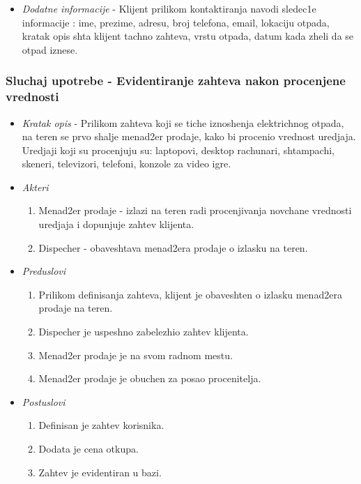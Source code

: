 \documentclass[10 pt]{article}
\begin{document}
\begin{itemize}
\begin{enumerate}
					
				\end{enumerate}

			
			\item\textit{Dodatne informacije}
-	Klijent prilikom kontaktiranja navodi sledec1e informacije :
ime, prezime, adresu, broj telefona, email, lokaciju otpada, kratak opis shta klijent tachno zahteva, vrstu otpada, datum kada zheli da se otpad iznese.

			
		\end{itemize}
	
	\subsubsection{Sluchaj upotrebe - Evidentiranje zahteva nakon procenjene vrednosti}
	
		\begin{itemize}

			\item\textit{Kratak opis} - Prilikom zahteva koji se tiche iznoshenja elektrichnog otpada, na teren se prvo shalje menad2er prodaje,
			kako bi procenio vrednost uredjaja. Uredjaji koji su procenjuju su:
			laptopovi, desktop rachunari, shtampachi, skeneri, televizori, telefoni, konzole za video igre.
			
			\item\textit{Akteri}
				\begin{enumerate}
					\item Menad2er prodaje - izlazi na teren radi procenjivanja novchane vrednosti uredjaja i dopunjuje zahtev klijenta.
					\item Dispecher - obaveshtava menad2era prodaje o izlasku na teren.
				\end{enumerate}
			
			\item\textit{Preduslovi} 
				\begin{enumerate} 
					\item Prilikom definisanja zahteva, klijent je obaveshten o izlasku menad2era prodaje na teren.
					\item Dispecher je uspeshno zabelezhio zahtev klijenta.
					\item Menad2er prodaje je na svom radnom mestu.
					\item Menad2er prodaje je obuchen za posao procenitelja.
				\end{enumerate}			
			
			\item\textit{Postuslovi}
				\begin{enumerate}
					\item Definisan je zahtev korisnika. 
					\item Dodata je cena otkupa.
					\item Zahtev je evidentiran u bazi.
				\end{enumerate}
			

\end{itemize}
\end{document}
